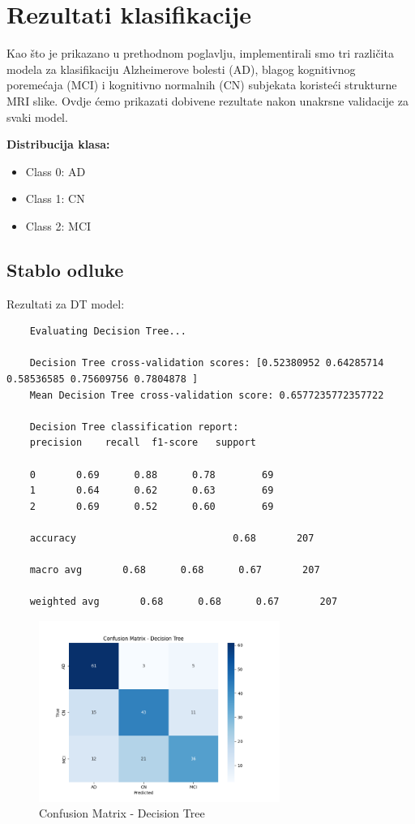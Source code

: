 \documentclass[zavrsnirad]{fer}
\begin{document}
\section{Rezultati klasifikacije}

Kao što je prikazano u prethodnom poglavlju, implementirali smo tri različita modela za klasifikaciju Alzheimerove bolesti (AD), blagog kognitivnog poremećaja (MCI) i kognitivno normalnih (CN) subjekata koristeći strukturne MRI slike. Ovdje ćemo prikazati dobivene rezultate nakon unakrsne validacije za svaki model.

\noindent \textbf{Distribucija klasa:}
\begin{itemize}
	\item Class 0: AD
	\item Class 1: CN
	\item Class 2: MCI
\end{itemize}


\subsection{Stablo odluke}

Rezultati za DT model:

\begin{verbatim}
	Evaluating Decision Tree...
	
	Decision Tree cross-validation scores: [0.52380952 0.64285714 0.58536585 0.75609756 0.7804878 ]
	Mean Decision Tree cross-validation score: 0.6577235772357722
	
	Decision Tree classification report:
	precision    recall  f1-score   support
	
	0       0.69      0.88      0.78        69
	1       0.64      0.62      0.63        69
	2       0.69      0.52      0.60        69
	
	accuracy                           0.68       207
	
	macro avg       0.68      0.68      0.67       207
	
	weighted avg       0.68      0.68      0.67       207
\end{verbatim}

\begin{figure}[h]
	\centering
	\includegraphics[width=0.7\textwidth]{Figures/matrix_dt_2.png}
	\caption{Confusion Matrix - Decision Tree}
	\label{fig:matrix_dt}
\end{figure}
\end{document}
